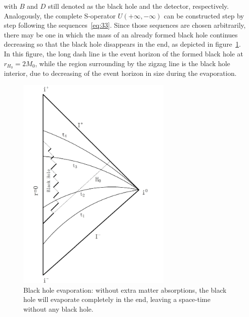 \documentclass[12pt,a4paper]{article}
\begin{document}
with $B$ and $D$ still denoted as the black hole and the detector,
respectively. Analogously, the complete S-operator $U(+\infty,-\infty)$ can be constructed step by step following the sequences~\eqref{eq:33}. Since those sequences are chosen arbitrarily, there may be one in which the mass of an already formed black hole continues decreasing so that the
black hole disappears in the end, as depicted in figure~\ref{fig:2}.
In this figure, the long dash line is the event horizon of the formed black hole at $r_{H_0}=2M_0$,
while the region surrounding by the zigzag line is the black hole interior, due to
decreasing of the event horizon in size during the evaporation.


\begin{figure}[tbp]
\setlength{\unitlength}{1mm} \centering
\includegraphics[width=3.0in]{fig2.pdf}
\caption{\label{fig:2}Black hole evaporation: without extra matter
absorptions, the black hole will evaporate completely in the end,
leaving a space-time without any black hole.}
\end{figure}
\end{document}
